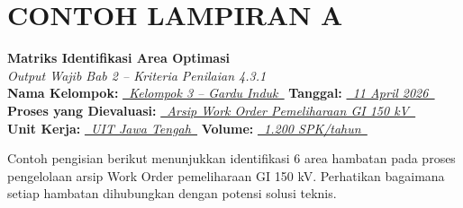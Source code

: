 \documentclass[12pt,a4paper]{report}
\begin{document}
\newpage
\section*{\color{plnblue} CONTOH LAMPIRAN A}
{\Large\bfseries Matriks Identifikasi Area Optimasi}\\[0.15cm]
{\normalsize\color{medgray}\textit{Output Wajib Bab 2 -- Kriteria Penilaian 4.3.1}}\\[0.4cm]

\noindent\textbf{Nama Kelompok:} \underline{\textit{~Kelompok 3 -- Gardu Induk~}} \quad \textbf{Tanggal:} \underline{\textit{~11 April 2026~}}\\[0.25cm]
\textbf{Proses yang Dievaluasi:} \underline{\textit{~Arsip Work Order Pemeliharaan GI 150 kV~}}\\[0.25cm]
\textbf{Unit Kerja:} \underline{\textit{~UIT Jawa Tengah~}} \quad \textbf{Volume:} \underline{\textit{~1.200 SPK/tahun~}}

\vspace{0.3cm}

\begin{contohbox}
Contoh pengisian berikut menunjukkan identifikasi 6 area hambatan pada proses pengelolaan arsip Work Order pemeliharaan GI 150 kV. Perhatikan bagaimana setiap hambatan dihubungkan dengan potensi solusi teknis.
\end{contohbox}

\vspace{0.3cm}
\end{document}
